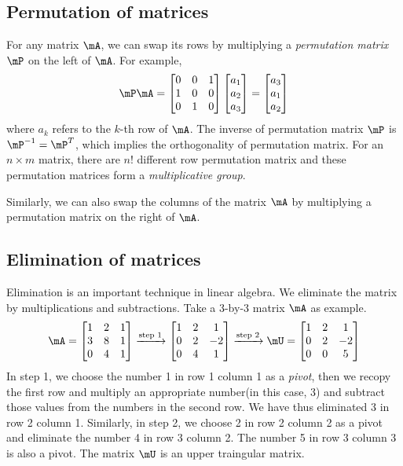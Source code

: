\documentclass[11pt]{article}
\theoremstyle{plain}
\theoremstyle{definition}
\begin{document}
\subsection{Permutation of matrices}
For any matrix $\mA$, we can swap its rows by multiplying a \textit{permutation matrix } $\mP$ on the left of $\mA$. For example,
\begin{align}
	\mP \mA = \begin{bmatrix}
		0 &0&1\\1 & 0 & 0\\ 0 & 1 & 0 
	\end{bmatrix}  \begin{bmatrix}
		a_1\\a_2\\ a_3
	\end{bmatrix}  = \begin{bmatrix}
		a_3\\a_1\\ a_2
	\end{bmatrix}
\end{align}
where $a_k$ refers to the $k$-th row of $\mA$. The inverse of permutation matrix $\mP$ is $\mP^{-1} = \mP^T$, which implies the orthogonality of permutation matrix. For an $n \times m$ matrix, there are $n!$ different row permutation matrix and these permutation matrices form a \textit{multiplicative group}.

\vspace{.2cm}
Similarly, we can also swap the columns of the matrix $\mA$ by multiplying a permutation matrix on the right of $\mA$.

\subsection{Elimination of matrices}
Elimination is an important technique in linear algebra. We eliminate the matrix by multiplications and subtractions. Take a 3-by-3 matrix $\mA$ as example.
\begin{align}
	\mA = \begin{bmatrix}
		1 &2&1\\3 & 8 & 1\\ 0 & 4 & 1 
	\end{bmatrix}
	\xrightarrow{\text{step 1}} \begin{bmatrix}
		1 &2&1\\0 & 2 & -2\\ 0 & 4 & 1 
	\end{bmatrix}
	\xrightarrow{\text{step 2}} \mU =  \begin{bmatrix}
		1 &2&1\\0 & 2 & -2\\ 0 & 0 & 5
	\end{bmatrix}
\end{align}
In step 1, we choose the number 1 in row 1 column 1 as a \textit{pivot}, then we recopy the first row and multiply an appropriate number(in this case, 3) and subtract those values from the numbers in the second row. We have thus eliminated 3 in row 2 column 1. Similarly, in step 2, we choose 2 in row 2 column 2 as a pivot and eliminate the number 4 in row 3 column 2.  The number 5 in row 3 column 3 is also a pivot. The matrix $\mU$ is an upper traingular matrix.
\end{document}
